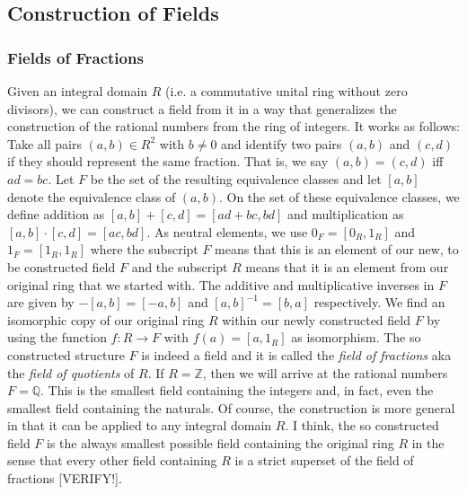 


\subsection{Construction of Fields}

\subsubsection{Fields of Fractions}
Given an integral domain $R$ (i.e. a commutative unital ring without zero divisors), we can construct a field from it in a way that generalizes the construction of the rational numbers from the ring of integers. It works as follows: Take all pairs $(a,b) \in R^2$ with $b \neq 0$ and identify two pairs $(a,b)$ and $(c,d)$ if they should represent the same fraction. That is, we say $(a,b) = (c,d)$ iff $a d = b c$. Let $F$ be the set of the resulting equivalence classes and let $[a,b]$ denote the equivalence class of $(a,b)$. On the set of these equivalence classes, we define addition as $[a,b] + [c,d] = [a d + bc, bd]$ and multiplication as  $[a,b] \cdot [c,d] = [ac, bd]$. As neutral elements, we use $0_F = [0_R, 1_R]$ and $1_F = [1_R, 1_R]$ where the subscript $F$ means that this is an element of our new, to be constructed field $F$ and the subscript $R$ means that it is an element from our original ring that we started with. The additive and multiplicative inverses in $F$ are given by $-[a,b] = [-a, b]$ and $[a,b]^{-1} = [b,a]$ respectively. We find an isomorphic copy of our original ring $R$ within our newly constructed field $F$ by using the function $f: R \rightarrow F$ with $f(a) = [a,1_R]$ as isomorphism. The so constructed structure $F$ is indeed a field and it is called the \emph{field of fractions} aka the \emph{field of quotients} of $R$. If $R = \mathbb{Z}$, then we will arrive at the rational numbers $F = \mathbb{Q}$. This is the smallest field containing the integers and, in fact, even the smallest field containing the naturals. Of course, the construction is more general in that it can be applied to any integral domain $R$. I think, the so constructed field $F$ is the always smallest possible field containing the original ring $R$ in the sense that every other field containing $R$ is a strict superset of the field of fractions [VERIFY!]. 

